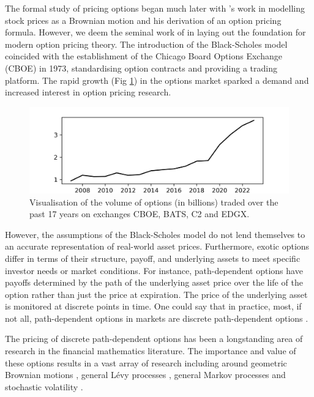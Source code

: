 \documentclass[a4paper]{report}
\begin{document}
The formal study of pricing options began much later with \citet{bachelier1900theorie}'s work in modelling stock prices as a Brownian motion and his derivation of an option pricing formula. However, we deem the seminal work of \citet{black1973pricing} in laying out the foundation for modern option pricing theory. The introduction of the Black-Scholes model coincided with the establishment of the Chicago Board Options Exchange (CBOE) in 1973, standardising option contracts and providing a trading platform. The rapid growth (Fig \ref{fig:volume_of_options}) in the options market sparked a demand and increased interest in option pricing research.

\begin{figure}[h]
	\centering
	\includegraphics[width=0.7\linewidth]{images/options_volume.png}
	\captionsetup{justification=centering}
    \caption{Visualisation of the volume of options (in billions) traded over the past 17 years on exchanges CBOE, BATS, C2 and EDGX.}
    \label{fig:volume_of_options}
\end{figure}
However, the assumptions of the Black-Scholes model do not lend themselves to an accurate representation of real-world asset prices. Furthermore, exotic options differ in terms of their structure, payoff, and underlying assets to meet specific investor needs or market conditions. For instance, path-dependent options have payoffs determined by the path of the underlying asset price over the life of the option rather than just the price at expiration. The price of the underlying asset is monitored at discrete points in time. One could say that in practice, most, if not all, path-dependent options in markets are discrete path-dependent options \citep{kou2007discrete}.

The pricing of discrete path-dependent options has been a longstanding area of research in the financial mathematics literature. The importance and value of these options results in a vast array of research including around geometric Brownian motions \citep{lu2017improved, guardasoni2020mellin}, general L\'evy processes \citep{fang2009novel, fusai2016spitzer, phelan2018fourier, chen2021sinc, levendorskii2022sinh}, general Markov processes \citep{cui2021pricing, zhang2023general} and stochastic volatility \citep{soleymani2019pricing, kirkby2020efficient}.
\end{document}

